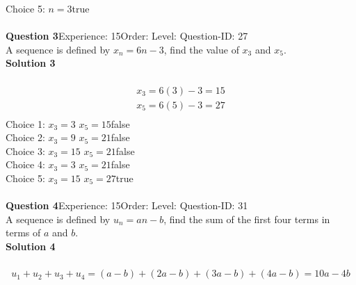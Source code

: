 \documentclass{article}
\begin{document}
Choice 5: \hspace{20pt}$n=3$\hspace{20pt}true\\
\\[4pt]
\noindent\textbf{Question 3}\hspace{20pt}Experience: 15\hspace{20pt}Order: \hspace{20pt}Level: \hspace{20pt}Question-ID: 27\\[2pt]
A sequence is defined by $x_n=6n-3$, find the value of $x_3$ and $x_5$.\\[4pt]
\noindent\textbf{Solution 3}\\[2pt]
\\[-35pt]\begin{align*}
x_3=6(3)-3=15\\[2pt]
x_5=6(5)-3=27\\[2pt]
\end{align*}
Choice 1: \hspace{20pt}$x_3=3 \,\, x_5=15$\hspace{20pt}false\\
Choice 2: \hspace{20pt}$x_3=9 \,\, x_5=21$\hspace{20pt}false\\
Choice 3: \hspace{20pt}$x_3=15 \,\, x_5=21$\hspace{20pt}false\\
Choice 4: \hspace{20pt}$x_3=3 \,\, x_5=21$\hspace{20pt}false\\
Choice 5: \hspace{20pt}$x_3=15 \,\, x_5=27$\hspace{20pt}true\\
\\[4pt]
\noindent\textbf{Question 4}\hspace{20pt}Experience: 15\hspace{20pt}Order: \hspace{20pt}Level: \hspace{20pt}Question-ID: 31\\[2pt]
A sequence is defined by $u_n=an-b$, find the sum of the first four terms in terms of $a$ and $b$.\\[4pt]
\noindent\textbf{Solution 4}\\[2pt]
\\[-35pt]\begin{align*}
u_1+u_2+u_3+u_4=(a-b)+(2a-b)+(3a-b)+(4a-b)=10a-4b
\end{align*}
\end{document}
